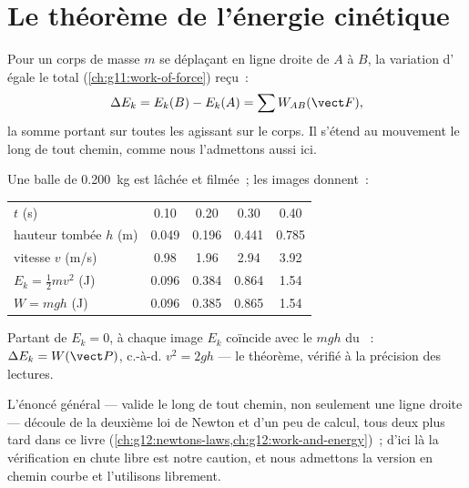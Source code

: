 \section{Le théorème de l'énergie cinétique}

\begin{theorem}\label{thm:g11:mechanical-energy:ketheorem}
Pour un corps de masse $m$ se déplaçant en ligne droite de $A$ à $B$,
la variation d' égale le
 total (\cref{ch:g11:work-of-force})
reçu~:
\[
\Delta E_k = E_k(B) - E_k(A) = \sum W_{AB}(\vect F),
\]
la somme portant sur toutes les  agissant
sur le corps. Il s'étend au mouvement le long de tout chemin, comme nous
l'admettons aussi ici.
\end{theorem}
\admitted

\begin{example}\label{ex:g11:mechanical-energy:freefall}
Une balle de \qty{0.200}{kg} est lâchée et filmée~; les images donnent~:
\begin{center}\small
\begin{tabular}{lcccc}
$t$ (\unit{s}) & 0.10 & 0.20 & 0.30 & 0.40\\
hauteur tombée $h$ (\unit{m}) & 0.049 & 0.196 & 0.441 & 0.785\\
vitesse $v$ (\unit{m/s}) & 0.98 & 1.96 & 2.94 & 3.92\\
$E_k = \tfrac12 mv^2$ (\unit{J}) & 0.096 & 0.384 & 0.864 & 1.54\\
$W = mgh$ (\unit{J}) & 0.096 & 0.385 & 0.865 & 1.54
\end{tabular}
\end{center}
Partant de $E_k = 0$, à chaque image $E_k$ coïncide avec le
 $mgh$ du
~: $\Delta E_k = W(\vect P)$,
c.-à-d. $v^2 = 2gh$ --- le théorème, vérifié à la précision des lectures.
\end{example}

\begin{remark}\label{rem:g11:mechanical-energy:proof}
L'énoncé général --- valide le long de tout chemin, non seulement une
ligne droite --- découle de la deuxième loi de Newton et d'un peu de
calcul, tous deux plus tard dans ce livre
(\cref{ch:g12:newtons-laws,ch:g12:work-and-energy})~; d'ici là la
vérification en chute libre est notre caution, et nous admettons la
version en chemin courbe et l'utilisons librement.
\end{remark}

